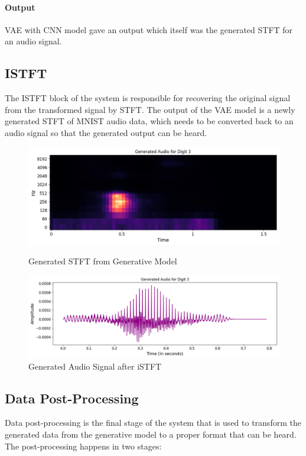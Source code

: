 \documentclass[12pt]{article}
\begin{document}
\paragraph{Output}
VAE with CNN model gave an output which itself was the generated STFT for an audio signal.


\subsection{ISTFT}
The ISTFT block of the system is responsible for recovering the original signal from the transformed signal by STFT. The output of the VAE model is a newly generated STFT of MNIST audio data, which needs to be converted back to an audio signal so that the generated output can be heard.

\begin{figure}[!h]
    \centering
    \begin{minipage}[b]{0.45\linewidth}
        \centering
        \includegraphics[width=\linewidth]{figures/gen_stft.png}
        \caption{Generated STFT from Generative Model}
        \label{fig:gen_stft}
    \end{minipage}
    \hfill
    \begin{minipage}[b]{0.45\linewidth}
        \centering
        \includegraphics[width=\linewidth]{generated_audio.png}
        \caption{Generated Audio Signal after iSTFT}
        \label{fig:generated_audio}
    \end{minipage}
\end{figure}


\subsection{Data Post-Processing}
Data post-processing is the final stage of the system that is used to transform the generated data from the generative model to a proper format that can be heard. The post-processing happens in two stages:
\end{document}
